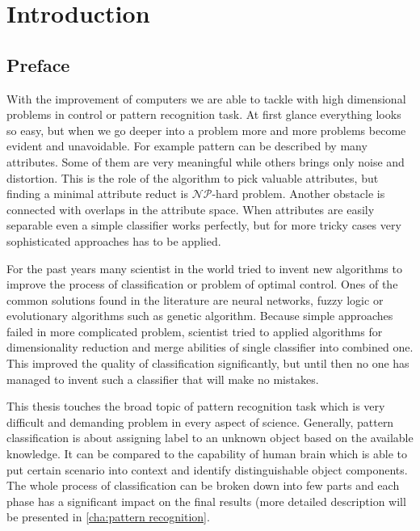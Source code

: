 \section{Introduction}
\subsection{Preface}
\label{cha:Goals}
With the improvement of computers we are able to tackle with high dimensional 
problems in control or pattern recognition task. At first glance everything
looks so easy, but when we go deeper into a problem more and more problems 
become evident and unavoidable. For example pattern can be described by many 
attributes. Some of them are very meaningful while others brings only noise 
and distortion. This is the role of the algorithm to pick valuable attributes,
but finding a minimal attribute reduct is $\mathcal{NP}$-hard problem. Another
obstacle is connected with overlaps in the attribute space. When attributes 
are easily separable even a simple classifier works perfectly, but for more 
tricky cases very sophisticated approaches has to be applied.

For the past years many scientist in the world tried to invent new algorithms 
to improve the process of classification or problem of optimal control. Ones 
of the common solutions found in the literature are neural networks, fuzzy
logic or evolutionary algorithms such as genetic algorithm. Because simple 
approaches failed in more complicated problem, scientist tried to applied 
algorithms for dimensionality reduction and merge abilities of single
classifier into combined one. This improved the quality of classification 
significantly, but until then no one has managed to invent such a classifier 
that will make no mistakes.

This thesis touches the broad topic of pattern recognition task which is 
very difficult and demanding problem in every aspect of science. Generally, 
pattern classification is about assigning label to an unknown object based 
on the available knowledge. It can be compared to the capability of human 
brain which is able to put certain scenario into context and identify 
distinguishable object components. The whole process of classification can 
be broken down into few parts and each phase has a significant impact on the
final results (more detailed description will be presented in \ref{cha:pattern
recognition}.

